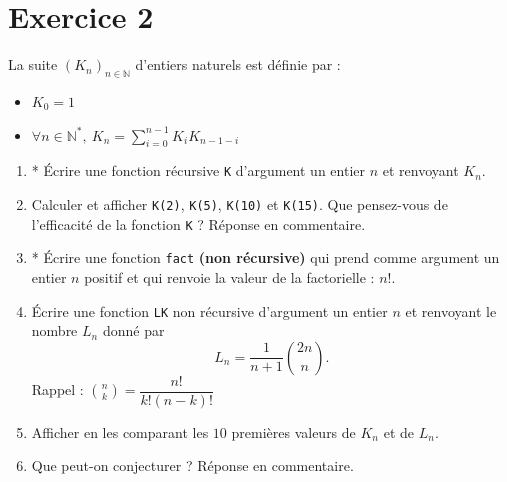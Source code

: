 \section*{Exercice 2}
La suite $(K_n)_{n\in \mathbb{N}}$ d'entiers naturels est définie par :
\begin{itemize}
\item $K_0=1$
\item $\forall n\in \mathbb{N}^*,~K_n=\sum\limits_{i=0}^{n-1}K_iK_{n-1-i}$
\end{itemize}
\begin{enumerate}
\item * \'Ecrire une fonction récursive \texttt{K} d'argument un entier $n$ et renvoyant $K_n$.
\item Calculer et afficher \texttt{K(2)}, \texttt{K(5)}, \texttt{K(10)} et \texttt{K(15)}. Que pensez-vous de l'efficacité de la fonction \texttt{K} ? Réponse en commentaire.
\item * \'Ecrire une fonction \texttt{fact} \textbf{(non récursive)} qui prend comme argument un entier $n$ positif et qui renvoie la valeur de la factorielle : $n!$.
\item \'Ecrire une fonction \texttt{LK} non récursive d'argument un entier $n$ et renvoyant le nombre $L_n$ donné par 
$$L_n=\frac{1}{n+1}\binom{2n}{n}.$$
Rappel : $\binom{n}{k}=\dfrac{n!}{k!(n-k)!}$
\item Afficher en les comparant les $10$ premières valeurs de $K_n$ et de $L_n$. 
\item Que peut-on conjecturer ? Réponse en commentaire.
\end{enumerate}




